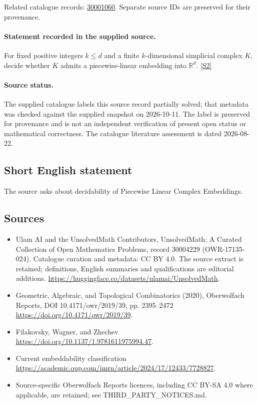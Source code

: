 \documentclass[11pt]{article}
\begin{document}
Related catalogue records: \href{https://mehmetmars7.github.io/Erdosproblems-llm-hunter/problem.html?type=open_problems&id=30001060}{30001060}. Separate source IDs are preserved for their provenance.
\paragraph{Statement recorded in the supplied source.}
For fixed positive integers $k\leq d$ and a finite $k$-dimensional simplicial complex $K$, decide whether $K$ admits a piecewise-linear embedding into $\mathbb R^d$. \href{https://doi.org/10.4171/owr/2019/39}{[S2]}
\paragraph{Source status.}
The supplied catalogue labels this source record partially solved; that metadata was checked against the supplied snapshot on 2026-10-11. The label is preserved for provenance and is not an independent verification of present open status or mathematical correctness. The catalogue literature assessment is dated 2026-08-22.
\subsection{Short English statement}
The source asks about decidability of Piecewise Linear Complex Embeddings.
\subsection{Sources}
\begin{itemize}
\item[S1] Ulam AI and the UnsolvedMath Contributors, UnsolvedMath: A Curated Collection of Open Mathematics Problems, record 30004229 (OWR-17135-024). Catalogue curation and metadata: CC BY 4.0. The source extract is retained; definitions, English summaries and qualifications are editorial additions.
\url{https://huggingface.co/datasets/ulamai/UnsolvedMath}.
\item[S2] Geometric, Algebraic, and Topological Combinatorics (2020), Oberwolfach Reports, DOI 10.4171/owr/2019/39, pp. 2395--2472
\url{https://doi.org/10.4171/owr/2019/39}.
\item[S3] Filakovsky, Wagner, and Zhechev
\url{https://doi.org/10.1137/1.9781611975994.47}.
\item[S4] Current embeddability classification
\url{https://academic.oup.com/imrn/article/2024/17/12433/7728827}.
\item Source-specific Oberwolfach Reports licences, including CC BY-SA 4.0 where applicable, are retained; see THIRD\_PARTY\_NOTICES.md.
\end{itemize}
\end{document}

